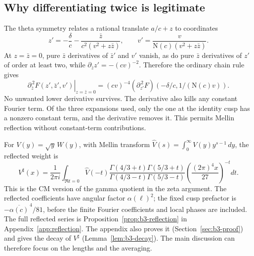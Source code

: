 \documentclass[11pt]{article}
\numberwithin{equation}{section}
\newcommand{\N}{\mathrm N}
\begin{document}
\subsection{Why differentiating twice is legitimate}
The theta symmetry relates a rational translate $a/c+z$ to coordinates
\begin{equation}\label{eq:d053}
 z'=-\frac\delta c-\frac{\bar z}{c^2(v^2+z\bar z)},\qquad
 v'=\frac v{\N(c)(v^2+z\bar z)}.
\end{equation}
At $z=\bar z=0$, pure $\bar z$ derivatives of $\bar z'$ and $v'$
vanish, as do pure $\bar z$ derivatives of $z'$ of order at least two, while
$\partial_{\bar z}z'=-(cv)^{-2}$. Therefore the ordinary chain rule gives
\begin{equation}\label{eq:chain}
 \left.\partial_{\bar z}^{\,2}F(z',\bar z',v')\right|_{z=\bar z=0}
   =(cv)^{-4}(\partial_{z'}^{\,2}F)
                  \left(-\delta/c,1/(\N(c)v)\right).
\end{equation}
No unwanted lower derivative survives. The derivative also kills any
constant Fourier term. Of the three expansions used, only the one at the
identity cusp has a nonzero constant term, and the derivative removes it.
This permits Mellin reflection without constant-term contributions.

For $V(y)=\sqrt y\,W(y)$, with Mellin transform
$\widehat V(s)=\int_0^\infty V(y)y^{s-1}\,dy$, the reflected weight is
\begin{equation}\label{eq:weight}
 V^\sharp(x)=\frac1{2\pi i}\int_{\Re t=0}\widehat V(-t)
 \frac{\Gamma(4/3+t)\Gamma(5/3+t)}{\Gamma(4/3-t)\Gamma(5/3-t)}
 \left(\frac{(2\pi)^4x}{27}\right)^{-t}dt.
\end{equation}
This is the CM version of the gamma quotient in the zeta argument.
The reflected coefficients have angular factor $\alpha(\ell)^2$;
the fixed cusp prefactor is $-\overline{\alpha(c)}^{\,4}/81$, before
the finite Fourier coefficients and local phases are included.
The full reflected series is Proposition~\ref{prop:b3-reflection} in
Appendix~\ref{app:reflection}. The appendix also proves it
(Section~\ref{sec:b3-proof}) and gives the decay of $V^\sharp$
(Lemma~\ref{lem:b3-decay}). The main discussion can therefore focus on
the lengths and the averaging.
\end{document}
